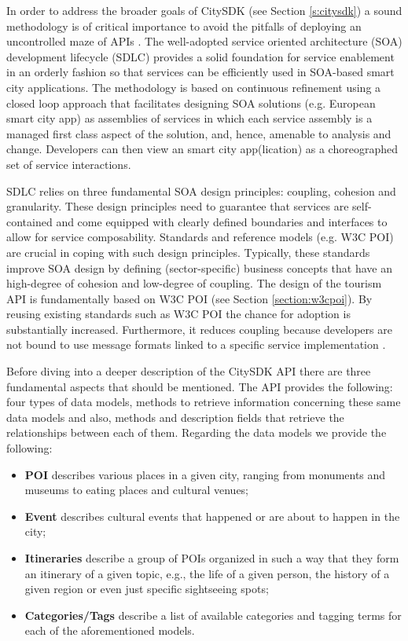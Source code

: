 \documentclass[times,doublespace]{ettauth}%
\begin{document}
In order to address the broader goals of CitySDK (see Section \ref{s:citysdk}) a sound methodology is of critical importance to avoid the pitfalls of deploying an uncontrolled maze of APIs \cite{papazoglou2007,monsieur2012}.
The well-adopted service oriented architecture (SOA) development lifecycle (SDLC) \cite{papazoglou2007} provides a solid foundation for service enablement in an orderly fashion so that services can be efficiently used in SOA-based smart city applications.
The methodology is based on continuous refinement using a closed loop approach that facilitates designing SOA solutions (e.g. European smart city app) as assemblies of services in which each service assembly is a managed first class aspect of the solution, and, hence, amenable to analysis and change. Developers can then view an smart city app(lication) as a choreographed set of service interactions.

SDLC relies on three fundamental SOA design principles: coupling, cohesion and granularity.
These design principles need to guarantee that services are self-contained and come equipped with clearly defined boundaries and interfaces to allow for service composability. Standards and reference models (e.g. W3C POI) are crucial in coping with such design principles.
Typically, these standards improve SOA design by defining (sector-specific) business concepts that have an high-degree of cohesion and low-degree of coupling.
The design of the tourism API is fundamentally based on W3C POI (see Section \ref{section:w3cpoi}).
By reusing existing standards such as W3C POI the chance for adoption is substantially increased. Furthermore, it reduces coupling because developers are not bound to use message formats linked to a specific service implementation \cite{papazoglou2007}.

Before diving into a deeper description of the CitySDK API there are three fundamental aspects that should be mentioned.
The API provides the following: four types of data models, methods to retrieve information concerning these same data models and also, methods and description fields that retrieve the relationships between each of them.
Regarding the data models we provide the following:
\begin{itemize}
\item \textbf{\ac{POI}} describes various places in a given city, ranging from monuments and museums to eating places and cultural venues; 
\item \textbf{Event} describes cultural events that happened or are about to happen in the city;
\item \textbf{Itineraries} describe a group of \acp{POI} organized in such a way that they form an itinerary of a given topic, e.g., the life of a given person, the history of a given region or even just specific sightseeing spots;
\item \textbf{Categories/Tags} describe a list of available categories and tagging terms for each of the aforementioned models.
\end{itemize}
\end{document}
